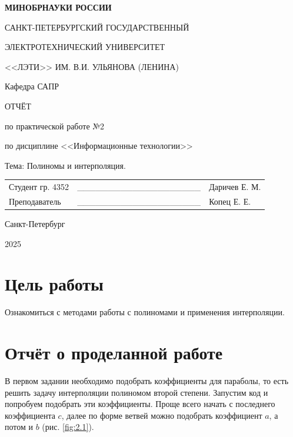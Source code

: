 \documentclass[14pt,a4paper]{extarticle}
\begin{document}
\begin{titlepage}
    \begin{center}
        {\bfseries
        МИНОБРНАУКИ РОССИИ\par
        САНКТ-ПЕТЕРБУРГСКИЙ ГОСУДАРСТВЕННЫЙ\par
        ЭЛЕКТРОТЕХНИЧЕСКИЙ УНИВЕРСИТЕТ\par
        <<ЛЭТИ>> ИМ. В.И. УЛЬЯНОВА (ЛЕНИНА)\par
        Кафедра САПР

        \vspace{0.23\textheight}
        ОТЧЁТ\par
        по практической работе №2\par
        по дисциплине <<Информационные технологии>>\par
        Тема: Полиномы и интерполяция.
        \vspace{0.28\textheight}
        }
        \begin{table}[h!]
            \begin{tabularx}{\textwidth}{p{60mm}X>{\centering\arraybackslash}p{45mm}}
                Студент гр. 4352 & \_\_\_\_\_\_\_\_\_\_\_\_\_\_\_\_\_\_\_\_ & {Даричев Е. М.} \\ [5.4mm]  %
                Преподаватель    & \_\_\_\_\_\_\_\_\_\_\_\_\_\_\_\_\_\_\_\_ & {Копец Е. Е.} \\ [5.4mm]
            \end{tabularx}
        \end{table}

        Санкт-Петербург\par
        2025
    \end{center}
\end{titlepage}
\setcounter{page}{2}

\section*{Цель работы}
    Ознакомиться с методами работы с полиномами и применения
интерполяции.

\section*{Отчёт о проделанной работе}
        В первом задании необходимо подобрать коэффициенты для параболы,
то есть решить задачу интерполяции полиномом второй степени. Запустим код
и попробуем подобрать эти коэффициенты. Проще всего начать с последнего
коэффициента $c$, далее по форме ветвей можно подобрать коэффициент $a$, а
потом и $b$ (рис. \ref{fig:2.1}).
\end{document}
